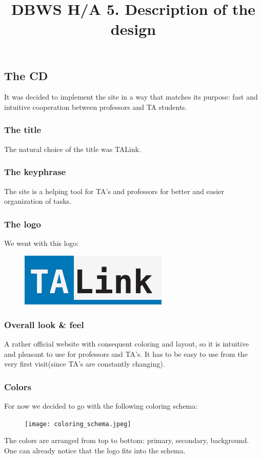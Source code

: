 \documentclass[]{article}
\title{DBWS H/A 5. Description of the design}
\begin{document}
	
\maketitle

\subsection*{The CD}
It was decided to implement the site in a way that matches its purpose: fast and intuitive cooperation between professors and TA students. 

\subsubsection*{The title}
The natural choice of the title was TALink.

\subsubsection*{The keyphrase}
The site is a helping tool for TA's and professors for better and easier organization of tasks.

\subsubsection*{The logo}
We went with this logo:
\begin{figure}[h]
	\centering
	\includegraphics[width=200pt]{logo.png}
	\captionsetup{labelformat=empty}
	\label{FIgure}
\end{figure}

\subsubsection*{Overall look \& feel}
A rather official website with consequent coloring and layout, so it is intuitive and pleasant to use for professors and TA's. It has to be easy to use from the very first visit(since TA's are constantly changing).

\newpage
\subsubsection*{Colors}
For now we decided to go with the following coloring schema:
\begin{figure}[h]
	\centering
	\texttt{[image: coloring\_schema.jpeg]}
	\captionsetup{labelformat=empty}
	\label{FIgure}
\end{figure}
\newline
The colors are arranged from top to bottom: primary, secondary, background. One can already notice that the logo fits into the schema.
\end{document}
